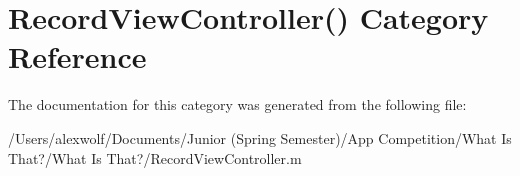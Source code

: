 \hypertarget{category_record_view_controller_07_08}{\section{Record\-View\-Controller() Category Reference}
\label{category_record_view_controller_07_08}
}


The documentation for this category was generated from the following file\-:\begin{DoxyCompactItemize}
\item 
/\-Users/alexwolf/\-Documents/\-Junior (\-Spring Semester)/\-App Competition/\-What Is That?/\-What Is That?/Record\-View\-Controller.\-m\end{DoxyCompactItemize}
